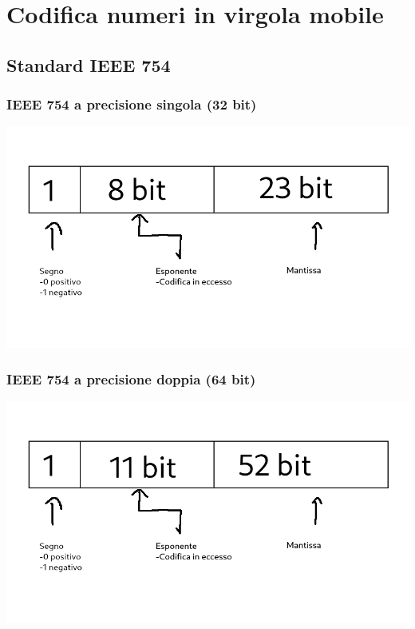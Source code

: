 \documentclass{article}
\begin{document}
          \section{Codifica numeri in virgola mobile}
          \subsection{ Standard IEEE 754}
          \subsubsection*{IEEE 754 a precisione singola (32 bit)}
          \includegraphics[bb=0 0 250 200]{pic/ieee32bit.png}
          \subsubsection*{IEEE 754 a precisione doppia (64 bit)}
          \includegraphics[bb=0 0 250 200]{pic/ieee64bit.png}
\end{document}
